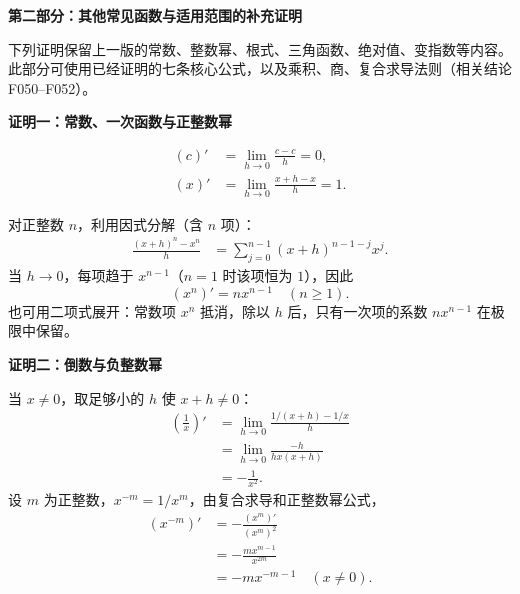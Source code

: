 \begin{proofbox}
\medskip
\begin{minipage}{\linewidth}
\textbf{\textcolor{CProof}{第二部分：其他常见函数与适用范围的补充证明}}

下列证明保留上一版的常数、整数幂、根式、三角函数、绝对值、变指数等内容。此部分可使用已经证明的七条核心公式，以及乘积、商、复合求导法则（相关结论 F050--F052）。
\end{minipage}

\medskip
\begin{minipage}{\linewidth}
\textbf{\textcolor{CProof}{证明一：常数、一次函数与正整数幂}}


\end{minipage}
\[
\begin{aligned}
(c)'&=\lim_{h\to0}\frac{c-c}{h}=0,\\
(x)'&=\lim_{h\to0}\frac{x+h-x}{h}=1.
\end{aligned}
\]


对正整数 $n$，利用因式分解（含 $n$ 项）：
\[
\begin{aligned}
\frac{(x+h)^n-x^n}{h}
&=\sum_{j=0}^{n-1}(x+h)^{n-1-j}x^j.
\end{aligned}
\]
当 $h\to0$，每项趋于 $x^{n-1}$（$n=1$ 时该项恒为 $1$），因此
\[
(x^n)'=nx^{n-1}\quad(n\ge1).
\]
也可用二项式展开：常数项 $x^n$ 抵消，除以 $h$ 后，只有一次项的系数 $nx^{n-1}$ 在极限中保留。



\medskip
\begin{minipage}{\linewidth}
\textbf{\textcolor{CProof}{证明二：倒数与负整数幂}}


\end{minipage}

当 $x\ne0$，取足够小的 $h$ 使 $x+h\ne0$：
\[
\begin{aligned}
\left(\frac1x\right)'&=\lim_{h\to0}\frac{1/(x+h)-1/x}{h}\\
&=\lim_{h\to0}\frac{-h}{hx(x+h)}\\
&=-\frac1{x^2}.
\end{aligned}
\]
设 $m$ 为正整数，$x^{-m}=1/x^m$，由复合求导和正整数幂公式，
\[
\begin{aligned}
(x^{-m})'&=-\frac{(x^m)'}{(x^m)^2}\\
&=-\frac{mx^{m-1}}{x^{2m}}\\
&=-mx^{-m-1}\quad(x\ne0).
\end{aligned}
\]


\end{proofbox}
